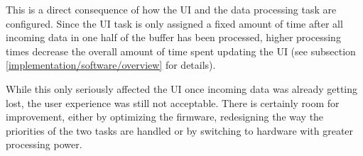 This is a direct consequence of how the UI and the data processing task are configured. Since the UI
task is only assigned a fixed amount of time after all incoming data in one half of the buffer has
been processed, higher processing times decrease the overall amount of time spent updating the UI (see
subsection \ref{implementation/software/overview} for details).

While this only seriously affected the UI once incoming data was already getting lost, the user
experience was still not acceptable. There is certainly room for improvement, either by optimizing
the firmware, redesigning the way the priorities of the two tasks are handled or by switching to
hardware with greater processing power.

